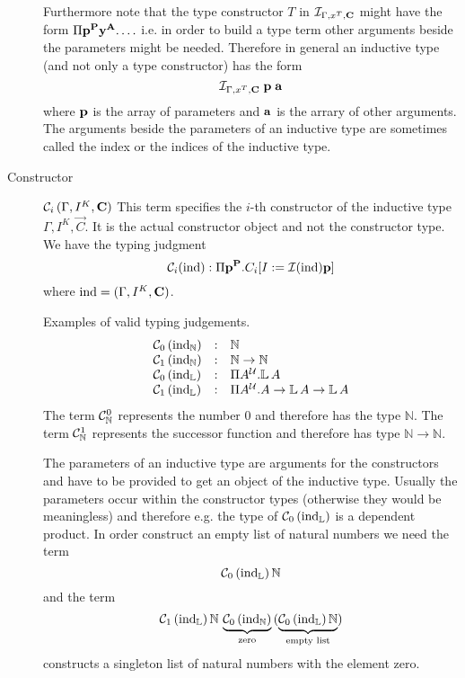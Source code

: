 \begin{description}
  Furthermore note that the type constructor $T$ in ${\cal I }_{\Gamma, x^T,
  \mathbf{C}}$ might have the form $\Pi \mathbf{p}^{\mathbf{P}} \mathbf{y}^{\mathbf{A}}. \ldots$ i.e. in
  order to build a type term other arguments beside the parameters might be
  needed.  Therefore in general an inductive type (and not only a type
  constructor) has the form $$ {\cal I }_{\Gamma, x^T, \mathbf{C}} \; \mathbf{p} \;
  \mathbf{a} $$ where $\mathbf{p}$ is the array of parameters and $\mathbf{a}$ is the arrary
  of other arguments. The arguments beside the parameters of an inductive type
  are sometimes called the index or the indices of the inductive type.




\item[Constructor] ${\cal C}_i\, (\Gamma, I^K, \mathbf{C})$
    This term specifies the $i$-th constructor of the inductive type $\Gamma,
    I^K, \vec{C}$. It is the actual constructor object and not the constructor
    type. We have the typing judgment
    $$
    {\cal C}_i (\text{ind})
    :
    \Pi \mathbf{p}^{\mathbf{P}} . C_i[I := {\cal I } (\text{ind}) \mathbf{p}]
    $$
    where $\text{ind} = (\Gamma, I^K, \mathbf{C})$.



    Examples of valid typing judgements.
    $$
    \begin{array}{lll}
        {\cal C}_0\, (\text{ind}_{\mathbb{N}})
        &:& {\mathbb{N}}
        \\
        {\cal C}_1\, (\text{ind}_{\mathbb{N}})
        &:& {\mathbb{N}} \to {\mathbb{N}}
        \\
        {\cal C}_0\, (\text{ind}_\mathbb{L})
        &:& \Pi A^{\cal{U}}. \mathbb{L} \, A
        \\
        {\cal C}_1\, (\text{ind}_\mathbb{L})
        &:& \Pi A^{\cal{U}}. A \to \mathbb{L}\, A \to \mathbb{L}\,A
    \end{array}
    $$
  The term ${\cal C}^0_{\mathbb{N}}$ represents the number $0$ and
  therefore has the type $\mathbb{N}$. The term ${\cal C}^1_{\mathbb{N}}$
  represents the successor function and therefore has type
  $\mathbb{N}\to\mathbb{N}$.

  The parameters of an inductive type are arguments for the constructors and
  have to be provided to get an object of the inductive type. Usually the
  parameters occur within the constructor types (otherwise they would be
  meaningless) and therefore e.g. the type of ${\cal C}_0\, (\text{ind}_{\mathbb{L}})$ is
  a dependent product. In order construct an empty list of natural numbers we
  need the term
  $$
  {\cal C}_0\, (\text{ind}_{\mathbb{L}}) \, {\mathbb{N}}
  $$
  and the term
  $$
  {\cal C}_1\, (\text{ind}_{\mathbb{L}})
  \,
  \mathbb{N}
  \,
  \underbrace{{\cal C}_0\, (\text{ind}_{\mathbb{N}})}_{\text{zero}}
  \,
  (\underbrace{{\cal C}_0\, (\text{ind}_{\mathbb{L}}) \, {\mathbb{N}}}_{\text{empty list}})
  $$
  constructs a singleton list of natural numbers with the element zero.








\end{description}
